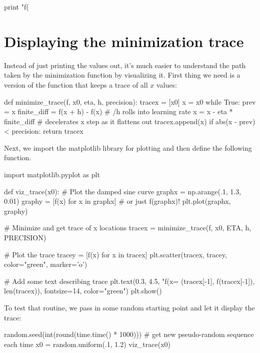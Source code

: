 \documentclass[titlepage]{tufte-book}
\begin{document}
\begin{fullwidth}
\begin{pyverbatim}
print "f(%
\end{pyverbatim}

\section{Displaying the minimization trace}

Instead of just printing the values out, it's much easier to understand the path taken by the minimization function by visualizing it. First thing we need is a version of the function that keeps a trace of all $x$ values:

\begin{pyverbatim}
def minimize_trace(f, x0, eta, h, precision):
    tracex = [x0]
    x = x0
    while True:
        prev = x
        finite_diff = f(x + h) - f(x)  # /h rolls into learning rate
        x = x - eta * finite_diff  # decelerates x step as it flattens out
        tracex.append(x)
        if abs(x - prev) < precision:
            return tracex
\end{pyverbatim}

Next, we import the matplotlib library for plotting and then define the following function.

\begin{pyverbatim}
import matplotlib.pyplot as plt

def viz_trace(x0):
    # Plot the damped sine curve
    graphx = np.arange(.1, 1.3, 0.01)
    graphy = [f(x) for x in graphx] # or just f(graphx)!
    plt.plot(graphx, graphy)

    # Minimize and get trace of x locations
    tracex = minimize_trace(f, x0, ETA, h, PRECISION)

    # Plot the trace
    tracey = [f(x) for x in tracex]
    plt.scatter(tracex, tracey, color="green", marker='o')
    
    # Add some text describing trace
    plt.text(0.3, 4.5, "f(x=%
             (tracex[-1], f(tracex[-1]), len(tracex)), fontsize=14,
             color="green")
    plt.show()
\end{pyverbatim}

\noindent To test that routine, we pass in some random starting point and let it display the trace:

\begin{pyverbatim}
random.seed(int(round(time.time() * 1000))) # get new pseudo-random sequence each time
x0 = random.uniform(.1, 1.2)
viz_trace(x0)
\end{pyverbatim}
 

\end{fullwidth}
\end{document}
